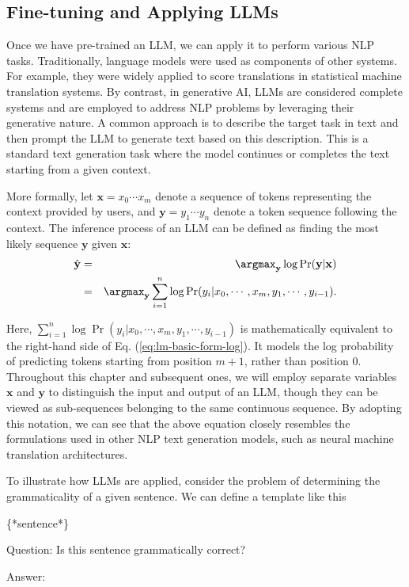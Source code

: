 \subsection{Fine-tuning and Applying LLMs}

\noindent Once we have pre-trained an LLM, we can apply it to perform various NLP tasks. Traditionally, language models were used as components of other systems. For example, they were widely applied to score translations in statistical machine translation systems. By contrast, in generative AI, LLMs are considered complete systems and are employed to address NLP problems by leveraging their generative nature. A common approach is to describe the target task in text and then prompt the LLM to generate text based on this description. This is a standard text generation task where the model continues or completes the text starting from a given context.

More formally, let $\mathbf{x} = x_0 \cdots x_m$ denote a sequence of tokens representing the context provided by users, and $\mathbf{y} = y_1 \cdots y_n$ denote a token sequence following the context. The inference process of an LLM can be defined as finding the most likely sequence $\mathbf{y}$ given $\mathbf{x}$:
\begin{eqnarray}
\hat{\mathbf{y}} & = & \argmax_{\mathbf{y}} \log \Pr(\mathbf{y} | \mathbf{x}) \nonumber \\
                 & = & \argmax_{\mathbf{y}} \sum_{i=1}^{n} \log \Pr(y_i|x_0,\cdots,x_m,y_1,\cdots,y_{i-1}).
\end{eqnarray}

\noindent Here, $\sum_{i=1}^{n} \log \Pr(y_i|x_0,\cdots,x_m,y_1,\cdots,y_{i-1})$ is mathematically equivalent to the right-hand side of Eq. (\ref{eq:lm-basic-form-log}). It models the log probability of predicting tokens starting from position $m+1$, rather than position $0$. Throughout this chapter and subsequent ones, we will employ separate variables $\mathbf{x}$ and $\mathbf{y}$ to distinguish the input and output of an LLM, though they can be viewed as sub-sequences belonging to the same continuous sequence. By adopting this notation, we can see that the above equation closely resembles the formulations used in other NLP text generation models, such as neural machine translation architectures.

To illustrate how LLMs are applied, consider the problem of determining the grammaticality of a given sentence. We can define a template like this
\vspace{0.5em}
\begin{tcolorbox}
\hspace{4em} \{*sentence*\}

\hspace{4em} Question: Is this sentence grammatically correct?

\hspace{4em} Answer: \underline{\hspace{2em}}
\end{tcolorbox}
\vspace{0.5em}

